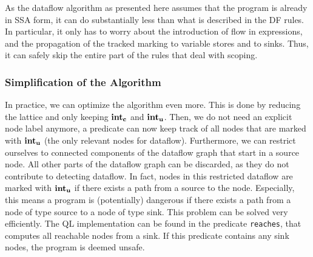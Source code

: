 As the dataflow algorithm as presented here assumes that the program is already in 
SSA form, it can do substantially less than what is described in the DF rules.
In particular, it only has to worry about the introduction of flow in expressions,
and the propagation of the tracked marking to variable stores and to sinks.
Thus, it can safely skip the entire part of the rules that deal with scoping.


\subsubsection*{Simplification of the Algorithm}
In practice, we can optimize the algorithm even more.
This is done by reducing the lattice and only keeping $\textbf{int}_\textbf{c}$ and $\textbf{int}_\textbf{u}$.
Then, we do not need an explicit node label anymore, a predicate can now
keep track of all nodes that are marked with $\textbf{int}_\textbf{u}$ (the only relevant nodes 
for dataflow).
Furthermore, we can restrict ourselves to connected components of the dataflow graph
that start in a source node.
All other parts of the dataflow graph can be discarded, as they do not contribute 
to detecting dataflow.
In fact, nodes in this restricted dataflow are marked with $\textbf{int}_\textbf{u}$ if there
exists a path from a source to the node.
Especially, this means a program is (potentially) dangerous if there exists a path
from a node of type source to a node of type sink.
This problem can be solved very efficiently.
The QL implementation can be found in the predicate \texttt{reaches},
that computes all reachable nodes from a sink.
If this predicate contains any sink nodes, the program is deemed unsafe.

